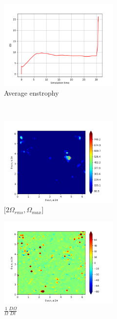 \begin{figure}[H]
    \begin{subfigure}[H]{0.45\textwidth}
        \includegraphics[height=1.75in]{media/run-cds-65/enst-average1400.png}
        \caption{Average enstrophy}
    \end{subfigure}
    ~
    \begin{subfigure}[H]{0.45\textwidth}
        \includegraphics[height=1.75in]{media/run-cds-65/enst-2-1400.png}
        \caption{$[2\Omega_{rms}, \Omega_{max} $] }
    \end{subfigure}
    \newline
    \begin{subfigure}[H]{0.45\textwidth}
        \includegraphics[height=1.75in]{media/run-cds-65/enst-1400.png}
        \caption{$\frac{1}{\Omega} \frac{D \Omega}{Dt}$}
    \end{subfigure}
    ~
    \begin{subfigure}{0.45\textwidth}

\end{subfigure}
\end{figure}
